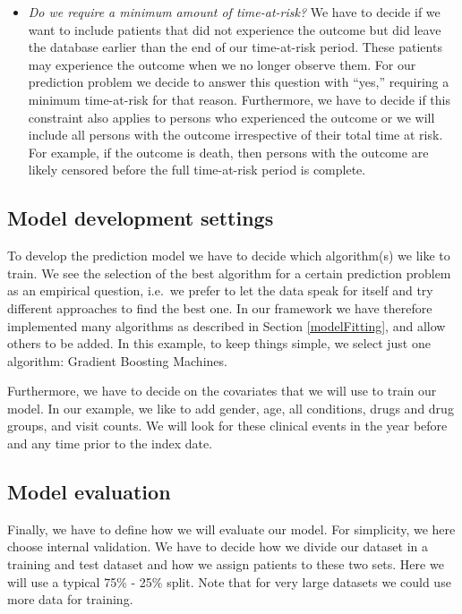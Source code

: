 \documentclass[11pt]{book}
\theoremstyle{definition}
\theoremstyle{definition}
\theoremstyle{definition}
\theoremstyle{remark}
\begin{document}
\begin{itemize}
\item
  \emph{Do we require a minimum amount of time-at-risk?} We have to decide if we want to include patients that did not experience the outcome but did leave the database earlier than the end of our time-at-risk period. These patients may experience the outcome when we no longer observe them. For our prediction problem we decide to answer this question with ``yes,'' requiring a minimum time-at-risk for that reason. Furthermore, we have to decide if this constraint also applies to persons who experienced the outcome or we will include all persons with the outcome irrespective of their total time at risk. For example, if the outcome is death, then persons with the outcome are likely censored before the full time-at-risk period is complete.
\end{itemize}

\hypertarget{model-development-settings}{%
\subsection{Model development settings}\label{model-development-settings}}

To develop the prediction model we have to decide which algorithm(s) we like to train. We see the selection of the best algorithm for a certain prediction problem as an empirical question, i.e.~we prefer to let the data speak for itself and try different approaches to find the best one. In our framework we have therefore implemented many algorithms as described in Section \ref{modelFitting}, and allow others to be added. In this example, to keep things simple, we select just one algorithm: Gradient Boosting Machines.

Furthermore, we have to decide on the covariates that we will use to train our model. In our example, we like to add gender, age, all conditions, drugs and drug groups, and visit counts. We will look for these clinical events in the year before and any time prior to the index date.

\hypertarget{model-evaluation}{%
\subsection{Model evaluation}\label{model-evaluation}}

Finally, we have to define how we will evaluate our model. For simplicity, we here choose internal validation. We have to decide how we divide our dataset in a training and test dataset and how we assign patients to these two sets. Here we will use a typical 75\% - 25\% split. Note that for very large datasets we could use more data for training.
\end{document}
